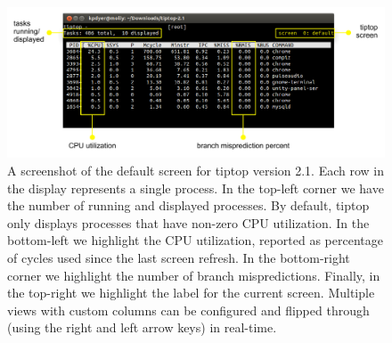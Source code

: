 \begin{figure}[t]
\footnotesize
\centering
\includegraphics[width=1\textwidth]{tiptop-default}
\caption{\footnotesize A screenshot of the default screen for tiptop version 2.1. Each row in the display represents a single process.
In the top-left corner we have the number of running and displayed processes.
By default, tiptop only displays processes that have non-zero CPU utilization.
In the bottom-left we highlight the CPU utilization, reported as percentage of cycles used since the last screen refresh.
In the bottom-right corner we highlight the number of branch mispredictions.
Finally, in the top-right we highlight the label for the current screen.
Multiple views with custom columns can be configured and flipped through (using the right and left arrow keys) in real-time.}
\label{fig:tiptop-default}
\end{figure}